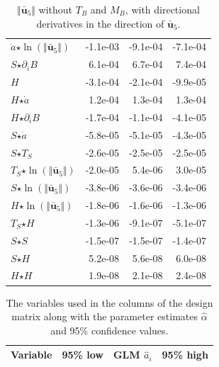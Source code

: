 \begin{table}[H]
\begin{tabular}{l|r|r|r}
  $\dot{a}$$ \star $$\ln\left( \Vert \bar{\mathbf{u}}_{5} \Vert \right)$ & -1.1e-03 & -9.1e-04 & -7.1e-04 \\
  $S$$ \star $$\partial_i B$ & 6.1e-04 & 6.7e-04 & 7.4e-04 \\
  $H$ & -3.1e-04 & -2.1e-04 & -9.9e-05 \\
  $H$$ \star $$\dot{a}$ & 1.2e-04 & 1.3e-04 & 1.3e-04 \\
  $H$$ \star $$\partial_i B$ & -1.7e-04 & -1.1e-04 & -4.1e-05 \\
  $S$$ \star $$\dot{a}$ & -5.8e-05 & -5.1e-05 & -4.3e-05 \\
  $S$$ \star $$T_S$ & -2.6e-05 & -2.5e-05 & -2.5e-05 \\
  \color{red}$T_S$$ \star $$\ln\left( \Vert \bar{\mathbf{u}}_{5} \Vert \right)$ & \color{red}-2.0e-05 & \color{red}5.4e-06 & \color{red}3.0e-05 \\
  $S$$ \star $$\ln\left( \Vert \bar{\mathbf{u}}_{5} \Vert \right)$ & -3.8e-06 & -3.6e-06 & -3.4e-06 \\
  $H$$ \star $$\ln\left( \Vert \bar{\mathbf{u}}_{5} \Vert \right)$ & -1.8e-06 & -1.6e-06 & -1.3e-06 \\
  $T_S$$ \star $$H$ & -1.3e-06 & -9.1e-07 & -5.1e-07 \\
  $S$$ \star $$S$ & -1.5e-07 & -1.5e-07 & -1.4e-07 \\
  $S$$ \star $$H$ & 5.2e-08 & 5.6e-08 & 6.0e-08 \\
  $H$$ \star $$H$ & 1.9e-08 & 2.1e-08 & 2.4e-08 \\
\end{tabular}
  \caption[]{\normalsize $\Vert \mathbf{\bar{u}}_5 \Vert$ without $T_B$ and $M_B$, with directional derivatives in the direction of $\mathbf{\bar{u}}_5$.}
\end{table}

\newpage

\begin{table}[H]
\centering
\begin{tabular}{l|r|r|r}
  \textbf{Variable} & \textbf{95\% low} & \textbf{GLM} $\hat{a}_i$ & \textbf{95\% high} \\
  \hline
\end{tabular}
  \caption[]{\normalsize The variables used in the columns of the design matrix along with the parameter estimates $\hat{\alpha}$ and 95\% confidence values.}
\end{table}

